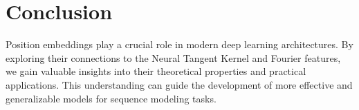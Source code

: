 \documentclass{article}
\begin{document}
\section{Conclusion}

Position embeddings play a crucial role in modern deep learning architectures. By exploring their connections to the Neural Tangent Kernel and Fourier features, we gain valuable insights into their theoretical properties and practical applications. This understanding can guide the development of more effective and generalizable models for sequence modeling tasks.



\end{document}
